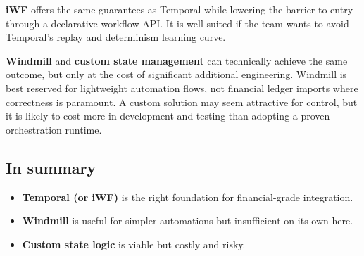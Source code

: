 \documentclass[11pt, a4paper, twocolumn]{article} %
\begin{document}
\textbf{iWF} offers the same guarantees as Temporal while lowering the barrier to entry through a declarative workflow API. It is well suited if the team wants to avoid Temporal’s replay and determinism learning curve.

\textbf{Windmill} and \textbf{custom state management} can technically achieve the same outcome, but only at the cost of significant additional engineering. Windmill is best reserved for lightweight automation flows, not financial ledger imports where correctness is paramount. A custom solution may seem attractive for control, but it is likely to cost more in development and testing than adopting a proven orchestration runtime.

\subsection*{In summary}

\begin{itemize}
\item \textbf{Temporal (or iWF)} is the right foundation for financial-grade integration.
\item \textbf{Windmill} is useful for simpler automations but insufficient on its own here.
\item \textbf{Custom state logic} is viable but costly and risky.
\end{itemize}






\end{document}
